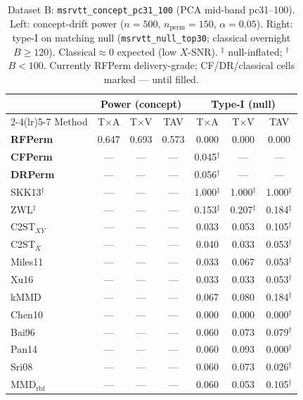 \begin{table}[t]
\centering\scriptsize\setlength{\tabcolsep}{2.5pt}
\caption{Dataset B: \texttt{msrvtt\_concept\_pc31\_100} (PCA mid-band pc31--100).
  Left: concept-drift power ($n=500$, $n_{\mathrm{perm}}=150$, $\alpha=0.05$).
  Right: type-I on matching null (\texttt{msrvtt\_null\_top30}; classical overnight $B\ge 120$).
  Classical$\approx 0$ expected (low $X$-SNR). $^\ddagger$ null-inflated; $^\dagger$ $B<100$.
  Currently RFPerm delivery-grade; CF/DR/classical cells marked --- until filled.
}
\label{tab:bench-msrvtt-concept-pc31-100}
\begin{tabular}{l ccc @{\hspace{1.0em}} ccc}
\toprule
& \multicolumn{3}{c}{\textbf{Power} (concept)} & \multicolumn{3}{c}{\textbf{Type-I} (null)} \\
\cmidrule(lr){2-4}\cmidrule(lr){5-7}
Method & T$\times$A & T$\times$V & TAV & T$\times$A & T$\times$V & TAV \\
\midrule
\textbf{RFPerm} & 0.647 & 0.693 & 0.573 & 0.000 & 0.000 & 0.000 \\
\textbf{CFPerm} & --- & --- & --- & 0.045$^\dagger$ & --- & --- \\
\textbf{DRPerm} & --- & --- & --- & 0.056$^\dagger$ & --- & --- \\
\midrule
SKK13$^\ddagger$ & --- & --- & --- & 1.000$^\ddagger$ & 1.000$^\ddagger$ & 1.000$^\ddagger$ \\
ZWL$^\ddagger$ & --- & --- & --- & 0.153$^\ddagger$ & 0.207$^\ddagger$ & 0.184$^\ddagger$ \\
C2ST$_{XY}$ & --- & --- & --- & 0.033 & 0.053 & 0.105$^\dagger$ \\
C2ST$_X$ & --- & --- & --- & 0.040 & 0.033 & 0.053$^\dagger$ \\
Miles11 & --- & --- & --- & 0.033 & 0.067 & 0.053$^\dagger$ \\
Xu16 & --- & --- & --- & 0.033 & 0.033 & 0.053$^\dagger$ \\
kMMD & --- & --- & --- & 0.067 & 0.080 & 0.184$^\dagger$ \\
Chen10 & --- & --- & --- & 0.000 & 0.000 & 0.000$^\dagger$ \\
Bai96 & --- & --- & --- & 0.060 & 0.073 & 0.079$^\dagger$ \\
Pan14 & --- & --- & --- & 0.060 & 0.093 & 0.000$^\dagger$ \\
Sri08 & --- & --- & --- & 0.060 & 0.073 & 0.026$^\dagger$ \\
MMD$_{\mathrm{rbf}}$ & --- & --- & --- & 0.060 & 0.053 & 0.105$^\dagger$ \\
\bottomrule\end{tabular}
\end{table}
